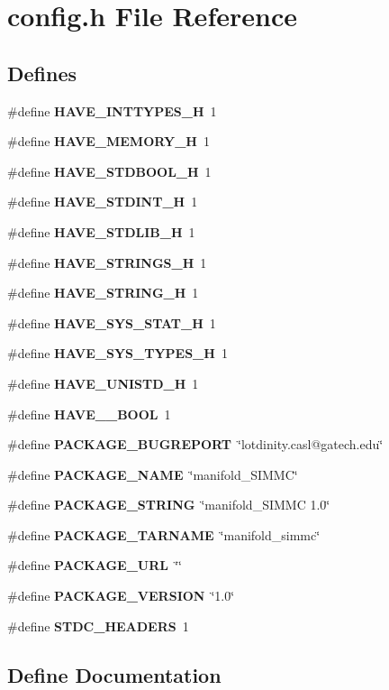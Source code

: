 \section{config.h File Reference}
\label{memctrl_2config_8h}
\subsection*{Defines}
\begin{CompactItemize}
\item 
\#define {\bf HAVE\_\-INTTYPES\_\-H}~1
\item 
\#define {\bf HAVE\_\-MEMORY\_\-H}~1
\item 
\#define {\bf HAVE\_\-STDBOOL\_\-H}~1
\item 
\#define {\bf HAVE\_\-STDINT\_\-H}~1
\item 
\#define {\bf HAVE\_\-STDLIB\_\-H}~1
\item 
\#define {\bf HAVE\_\-STRINGS\_\-H}~1
\item 
\#define {\bf HAVE\_\-STRING\_\-H}~1
\item 
\#define {\bf HAVE\_\-SYS\_\-STAT\_\-H}~1
\item 
\#define {\bf HAVE\_\-SYS\_\-TYPES\_\-H}~1
\item 
\#define {\bf HAVE\_\-UNISTD\_\-H}~1
\item 
\#define {\bf HAVE\_\-\_\-BOOL}~1
\item 
\#define {\bf PACKAGE\_\-BUGREPORT}~\char`\"{}lotdinity.casl@gatech.edu\char`\"{}
\item 
\#define {\bf PACKAGE\_\-NAME}~\char`\"{}manifold\_\-SIMMC\char`\"{}
\item 
\#define {\bf PACKAGE\_\-STRING}~\char`\"{}manifold\_\-SIMMC 1.0\char`\"{}
\item 
\#define {\bf PACKAGE\_\-TARNAME}~\char`\"{}manifold\_\-simmc\char`\"{}
\item 
\#define {\bf PACKAGE\_\-URL}~\char`\"{}\char`\"{}
\item 
\#define {\bf PACKAGE\_\-VERSION}~\char`\"{}1.0\char`\"{}
\item 
\#define {\bf STDC\_\-HEADERS}~1
\end{CompactItemize}


\subsection{Define Documentation}
